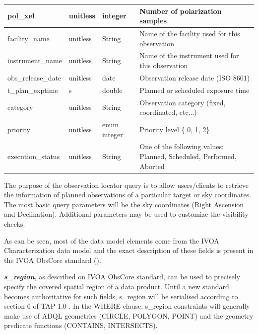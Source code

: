 \documentclass[11pt,a4paper]{ivoa}
\begin{document}
\begin{landscape}
\begin{table}
\begin{tabular}{ |l|l|l|l| }
\hline
pol\_xel & 
unitless & 
integer & 
Number of polarization samples \\
\hline
facility\_name & 
unitless & 
String & 
Name of the facility used for this observation \\
\hline
instrument\_name & 
unitless & 
String & 
Name of the instrument used for this observation \\
\hline
obs\_release\_date & 
unitless & 
date & 
Observation release date (ISO 8601) \\
\hline
t\_plan\_exptime & 
s & 
double & 
Planned or scheduled exposure time \\
\hline
category & 
unitless & 
String & 
Observation category (fixed, coordinated, etc...) \\
\hline
priority & 
unitless & 
enum integer & 
Priority level $ \{ $ 0, 1, 2$ \} $ \\
\hline
execution\_status & 
unitless & 
String & 
One of the following values:  Planned, Scheduled, Performed, Aborted \\
\hline
\end{tabular}
\end{table}
\end{landscape}


The purpose of the observation locator query is to allow users/clients to retrieve the 
information of planned observations of a particular target or sky coordinates. The most 
basic query parameters will be the sky coordinates (Right Ascension and Declination). 
Additional parameters may be used to customize the visibility checks.

As can be seen, most of the data model elements come from the IVOA Characterization 
data model and the exact description of these fields is present in the IVOA ObsCore 
standard (\cite{2017ivoa.spec.0509L}).

\textbf{\textit{s\_region}}, as described on IVOA ObsCore standard, can be used to 
precisely specify the covered spatial region of a data product. Until a new standard
becomes authoritative for such fields, s\_region will be serialised according to
section 6 of TAP 1.0 \citep{2011ivoa.spec.1028T}. In the WHERE clause, s\_region
constraints will generally make use of ADQL geometries (CIRCLE, POLYGON, POINT) and
the geometry predicate functions (CONTAINS, INTERSECTS).
\end{document}
